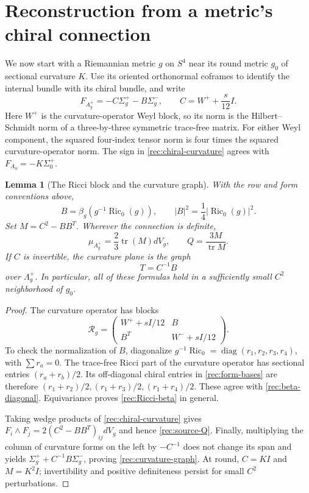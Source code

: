 \documentclass[11pt]{article}
\numberwithin{equation}{section}
\newtheorem{lemma}[theorem]{Lemma}
\theoremstyle{definition}
\theoremstyle{remark}
\DeclareMathOperator{\Ric}{Ric}
\begin{document}
\section{Reconstruction from a metric's chiral connection}
\label{rec:source-metric-section}

We now start with a Riemannian metric $g$ on $S^4$ near its round metric
$g_0$ of sectional curvature $K$.  Use its oriented orthonormal coframes to
identify the internal bundle with its chiral bundle, and write
\begin{equation}
 F_{A_g^+}=-C\Sigma_g^+-B\Sigma_g^-,\qquad
 C=W^++\frac{s}{12}I.
 \label{rec:chiral-curvature}
\end{equation}
Here $W^+$ is the curvature-operator Weyl block, so its norm is the
Hilbert--Schmidt norm of a three-by-three symmetric trace-free matrix.
For either Weyl component, the squared four-index tensor norm is four
times the squared curvature-operator norm.  The sign in
\eqref{rec:chiral-curvature} agrees with $F_{A_0}=-K\Sigma_0^+$.

\begin{lemma}[The Ricci block and the curvature graph]
\label{rec:ricci-block}
With the row and form conventions above,
\begin{equation}
 B=\beta_g(g^{-1}\Ric_0(g)),\qquad
 |B|^2=\frac14|\Ric_0(g)|^2.
 \label{rec:Ricci-beta}
\end{equation}
Set $M=C^2-BB^T$.  Wherever the connection is definite,
\begin{equation}
 \mu_{A_g^+}=\frac23\operatorname{tr}(M)dV_g,\qquad
 Q=\frac{3M}{\operatorname{tr}M}.
 \label{rec:source-Q}
\end{equation}
If $C$ is invertible, the curvature plane is the graph
\begin{equation}
 T=C^{-1}B
 \label{rec:curvature-graph}
\end{equation}
over $\Lambda_g^+$.  In particular, all of these formulas hold in a
sufficiently small $C^2$ neighborhood of $g_0$.
\end{lemma}

\begin{proof}
The curvature operator has blocks
\[
 \mathcal R_g=
 \begin{pmatrix}W^++sI/12&B\\B^T&W^-+sI/12\end{pmatrix}.
\]
To check the normalization of $B$, diagonalize
$g^{-1}\Ric_0=\operatorname{diag}(r_1,r_2,r_3,r_4)$, with
$\sum r_a=0$.  The trace-free Ricci part of the curvature operator has
sectional entries $(r_a+r_b)/2$.  Its off-diagonal chiral entries in
\eqref{rec:form-bases} are therefore
$(r_1+r_2)/2,(r_1+r_3)/2,(r_1+r_4)/2$.  These agree with
\eqref{rec:beta-diagonal}.  Equivariance proves
\eqref{rec:Ricci-beta} in general.

Taking wedge products of \eqref{rec:chiral-curvature} gives
$F_i\wedge F_j=2(C^2-BB^T)_{ij}dV_g$ and hence
\eqref{rec:source-Q}.  Finally, multiplying the column of curvature
forms on the left by $-C^{-1}$ does not change its span and yields
$\Sigma_g^++C^{-1}B\Sigma_g^-$, proving
\eqref{rec:curvature-graph}.  At round, $C=KI$ and $M=K^2I$;
invertibility and positive definiteness persist for small $C^2$
perturbations.
\end{proof}
\end{document}
